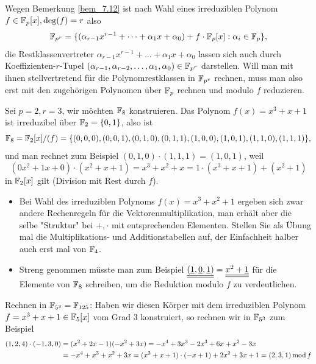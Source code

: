 \begin{bem}
	Wegen Bemerkung \ref{bem_7.12} ist nach Wahl eines irreduziblen Polynom $f \in \mathbb{F}_p[x], \deg(f) = r$ also
	\[\mathbb{F}_{p^r} = \{ (\alpha_{r-1} x^{r-1} + \dots + \alpha_1 x + \alpha_0) + f \cdot \mathbb{F}_p[x] : \alpha_i \in \mathbb{F}_p\},\]
	die Restklassenvertreter $\alpha_{r-1} x^{r-1} + \dots + \alpha_1 x + \alpha_0$ lassen sich auch durch Koeffizienten-$r$-Tupel $(\alpha_{r-1}, \alpha_{r-2}, \dots, \alpha_1, \alpha_0) \in \mathbb{F}_{p^r}$ darstellen. Will man mit ihnen stellvertretend für die Polynomrestklassen in $\mathbb{F}_{p^r}$ rechnen, muss man also erst mit den zugehörigen Polynomen über $\mathbb{F}_p$ rechnen und modulo $f$ reduzieren.
\end{bem}

\begin{bsp}
	Sei $p = 2, r=3$, wir möchten $\mathbb{F}_8$ konstruieren. Das Polynom $f(x) = x^3 + x + 1$ ist irreduzibel über $\mathbb{F}_2 = \{0,1\}$, also ist 
	\[ \mathbb{F}_8 = \mathbb{F}_2[x]/(f) = \{ (0,0,0), (0,0,1), (0,1,0), (0,1,1), (1,0,0), (1,0,1), (1,1,0), (1,1,1)\}, \]
	und man rechnet zum Beispiel $(0,1,0) \cdot (1,1,1) = (1,0,1)$, weil
	\[ (0x^2 + 1x + 0) \cdot (x^2 + x + 1) = x^3 + x^2 + x = 1 \cdot (x^3 + x + 1) + (x^2 + 1) \]
	in $\mathbb{F}_2[x]$ gilt (Division mit Rest durch $f$). \begin{itemize}
	\item Bei Wahl des irreduziblen Polynoms $f(x) = x^3 + x^2 + 1$ ergeben sich zwar andere Rechenregeln für die Vektorenmultiplikation, man erhält aber die selbe "Struktur" bei $+,\cdot$ mit entsprechenden Elementen. Stellen Sie als Übung mal die Multiplikations- und Additionstabellen auf, der Einfachheit halber auch erst mal von $\mathbb{F}_4$.
	\item Streng genommen müsste man zum Beispiel $\uline{\uline{(\uline{1}, \uline{0}, \uline{1})}} = \uline{\uline{x^2 + \uline{1}}}$ für die Elemente von $\mathbb{F}_8$ schreiben, um die Reduktion modulo $f$ zu verdeutlichen.
	\end{itemize}
\end{bsp}

\begin{bsp}
	Rechnen in $\mathbb{F}_{5^3} = \mathbb{F}_{125}$: Haben wir diesen Körper mit dem irreduziblen Polynom $f = x^3 + x + 1 \in \mathbb{F}_5[x]$ vom Grad $3$ konstruiert, so rechnen wir in $\mathbb{F}_{5^3}$ zum Beispiel
	\begin{equation}
	\begin{aligned}
		(1,2,4) \cdot (-1,3,0) &= (x^2 + 2x - 1)(-x^2 + 3x) = -x^4 + 3x^3 - 2x^3 + 6x + x^2 -3x \\
		&= -x^4 + x^3 + x^2 + 3x = (x^3+x+1) \cdot (-x+1) + 2x^2+3x+1 = (2,3,1) \operatorname{mod} f
	\end{aligned}
	\end{equation}
\end{bsp}

